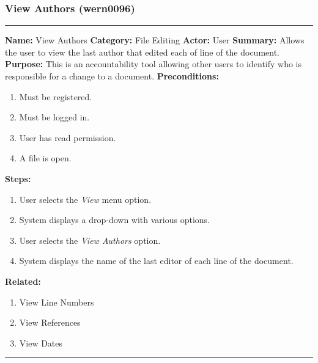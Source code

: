 \documentclass[11pt]{report}
\begin{document}
\subsubsection{View Authors (wern0096)}
\vspace{2pt}
\hrule
\vspace{8pt}
	\noindent\textbf{Name:} View Authors \newline
	\textbf{Category:} File Editing \newline
	\textbf{Actor:} User \newline
	\textbf{Summary:} Allows the user to view the last author that edited each of line of the document. \newline
	\textbf{Purpose:} This is an accountability tool allowing other users to identify who is responsible for a change to a document. \newline
	\textbf{Preconditions:}
	\begin{enumerate}
		\item Must be registered.
		\item Must be logged in.
		\item User has read permission.
		\item A file is open.
	\end{enumerate}
	\textbf{Steps:}
	\begin{enumerate}
		\item User selects the \textit{View} menu option.
		\item System displays a drop-down with various options.
		\item User selects the \textit{View Authors} option.
		\item System displays the name of the last editor of each line of the document.
	\end{enumerate}
	\textbf{Related:}
	\begin{enumerate}
		\item View Line Numbers
		\item View References
		\item View Dates
	\end{enumerate}
\vspace{8pt}
\hrule
\newpage
\end{document}
